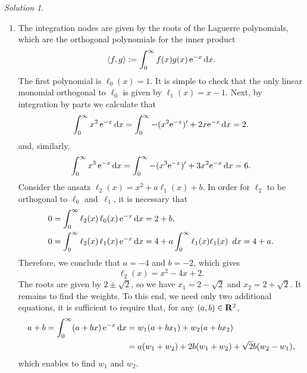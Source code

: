 \documentclass[11pt]{article}
\theoremstyle{definition}
\theoremstyle{remark}
\newtheorem*{solution}{Solution}
\begin{document}
\begin{solution}
\begin{enumerate}
        \item
            The integration nodes are given by the roots of the Laguerre polynomials,
            which are the orthogonal polynomials for the inner product
            \[
                \langle f, g\rangle :=
                \int_{0}^{\infty} f(x) g(x) \, \mathrm e^{-x} \, \mathrm d x.
            \]
            The first polynomial is $\ell_0(x) = 1$.
            It is simple to check that the only linear monomial orthogonal to $\ell_0$ is given by $\ell_1(x) = x - 1$.
            Next, by integration by parts we calculate that
            \[
                \int_{0}^{\infty} x^2 \, \mathrm e^{-x} \, \mathrm d x 
                = \int_{0}^{\infty} - (x^2 \mathrm e^{-x})' + 2 x \mathrm e^{-x} \, \mathrm d x = 2.
            \]
            and, similarly,
            \[
                \int_{0}^{\infty} x^3 \, \mathrm e^{-x} \, \mathrm d x 
                = \int_{0}^{\infty} - (x^3 \mathrm e^{-x})' + 3 x^2 \mathrm e^{-x} \, \mathrm d x = 6.
            \]
            Consider the ansatz $\ell_2(x) = x^2 + a \ell_1(x) + b$.
            In order for $\ell_2$ to be orthogonal to $\ell_0$ and~$\ell_1$,
            it is necessary that
            \begin{align*}
                0 &= \int_{0}^{\infty} \ell_{2}(x) \, \ell_0(x) \, \mathrm e^{-x} \, \mathrm d x = 2 + b, \\
                0 &= \int_{0}^{\infty} \ell_{2}(x) \, \ell_1(x) \, \mathrm e^{-x} \, \mathrm d x 
                = 4 + a \int_{0}^{\infty} \ell_1(x) \ell_1(x) \, \ d x = 4 + a.
            \end{align*}
            Therefore, we conclude that $a = -4$ and $b=-2$,
            which gives
            \[
                \ell_2(x) = x^2 - 4 x + 2.
            \]
            The roots are given by $2 \pm \sqrt{2}$,
            so we have $x_1 = 2 - \sqrt{2}$ and $x_2 = 2 + \sqrt{2}$.
            It remains to find the weights.
            To this end, we need only two additional equations,
            it is sufficient to require that, for any $(a,b) \in \mathbf R^2$,
            \begin{align*}
                a + b = 
                \int_{0}^{\infty} (a + bx) \, \mathrm e^{-x} \, \mathrm d x 
                &= w_1 (a + b x_1) + w_2 (a + b x_2) \\
                &= a (w_1 + w_2) + 2 b (w_1 + w_2) + \sqrt{2} b (w_2 - w_1),
            \end{align*}
            which enables to find $w_1$ and $w_2$.
    \end{enumerate}
\end{solution}
\end{document}
